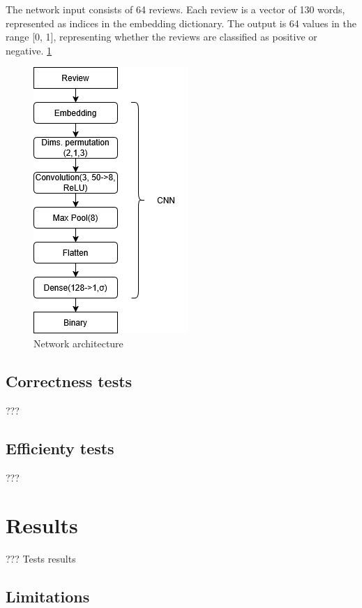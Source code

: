 \documentclass[conference]{IEEEtran}
\begin{document}
The network input consists of 64 reviews. Each review is a vector of 130 words, represented as indices in the embedding dictionary. The output is 64 values in the range [0, 1], representing whether the reviews are classified as positive or negative. \ref{fig:Network_architecture}

\begin{figure}
    \centering
    \includegraphics[height=0.9\linewidth]{Network.png}
    \caption{Network architecture}
    \label{fig:Network_architecture}
\end{figure}

\subsection{Correctness tests}
???

\subsection{Efficienty tests}
???

\section{Results}
??? Tests results

\subsection{Limitations}
\end{document}
